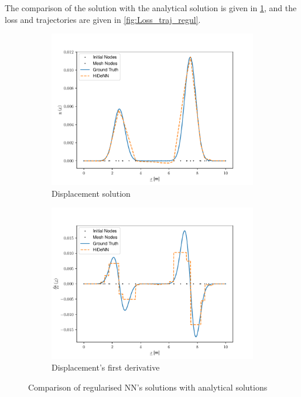 The comparison of the solution with the analytical solution is given in \cref{fig:FirstSol_regul}, and the loss and trajectories are given in \cref{fig:Loss_traj_regul}.
\begin{figure}
    \begin{subfigure}{0.5\linewidth}
        \centering
        \includegraphics[width=\linewidth]{Figures/Solution_displacement_Regul64.pdf}
        \caption{Displacement solution}
    \end{subfigure}
    \begin{subfigure}{0.5\linewidth}
        \centering
        \includegraphics[width=\linewidth]{Figures/Solution_gradients_Regul64.pdf}
        \caption{Displacement's first derivative}
    \end{subfigure}
    \caption{Comparison of regularised NN's solutions with analytical solutions}
    \label{fig:FirstSol_regul}
\end{figure}
